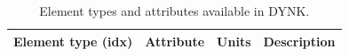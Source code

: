 \begin{table}[h]
\begin{center}
\caption{Element types and attributes available in DYNK.}
\label{tab:DYNK_SET} %
\begin{tabular}{|l | l l p{6cm}|}

  \hline
  \rowcolor{blue!30}
  Element type (idx) & Attribute & Units & Description \\
  \hline


  


\end{tabular}
\end{center}
\end{table}
